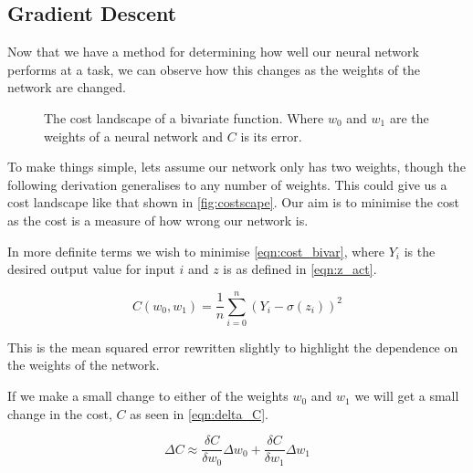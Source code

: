 \subsection{Gradient Descent}
Now that we have a method for determining how well our neural network performs at a task, we can observe how this changes as the weights of the network are changed.


\begin{figure}
\begin{center}
\caption{The cost landscape of a bivariate function. Where $w_0$ and $w_1$ are the weights of a neural network and $C$ is its error.}
\label{fig:costscape}
\end{center}
\end{figure}

To make things simple, lets assume our network only has two weights, though the following derivation generalises to any number of weights. This could give us a cost landscape like that shown in \autoref{fig:costscape}. Our aim is to minimise the cost as the cost is a measure of how wrong our network is.

In more definite terms we wish to minimise \autoref{eqn:cost_bivar}, where $Y_i$ is the desired output value for input $i$ and $z$ is as defined in \autoref{eqn:z_act}.

\begin{equation} \label{eqn:cost_bivar}
C(w_0, w_1) = \frac{1}{n}\sum_{i=0}^{n} (Y_i - \sigma(z_i))^2
\end{equation}

This is the mean squared error rewritten slightly to highlight the dependence on the weights of the network.

If we make a small change to either of the weights $w_0$ and $w_1$ we will get a small change in the cost, $C$ as seen in \autoref{eqn:delta_C}.

\begin{equation} \label{eqn:delta_C}
\Delta C \approx \frac{\delta C}{\delta w_0} \Delta w_0 + \frac{\delta C}{\delta w_1} \Delta w_1
\end{equation}

